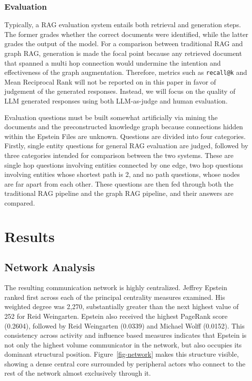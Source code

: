 \documentclass[
  letterpaper,
  DIV=11,
  numbers=noendperiod]{scrartcl}
\begin{document}
\subsubsection{Evaluation}\label{evaluation}

Typically, a RAG evaluation system entails both retrieval and generation
steps. The former grades whether the correct documents were identified,
while the latter grades the output of the model. For a comparison
between traditional RAG and graph RAG, generation is made the focal
point because any retrieved document that spanned a multi hop connection
would undermine the intention and effectiveness of the graph
augmentation. Therefore, metrics such as \texttt{recall@k} and Mean
Reciprocal Rank will not be reported on in this paper in favor of
judgement of the generated responses. Instead, we will focus on the
quality of LLM generated responses using both LLM-as-judge and human
evaluation.

Evaluation questions must be built somewhat artificially via mining the
documents and the preconstructed knowledge graph because connections
hidden within the Epstein Files are unknown. Questions are divided into
four categories. Firstly, single entity questions for general RAG
evaluation are judged, followed by three categories intended for
comparison between the two systems. These are single hop questions
involving entities connected by one edge, two hop questions involving
entities whose shortest path is 2, and no path questions, whose nodes
are far apart from each other. These questions are then fed through both
the traditional RAG pipeline and the graph RAG pipeline, and their
answers are compared.

\section{Results}\label{results}

\subsection{Network Analysis}\label{network-analysis-1}

The resulting communication network is highly centralized. Jeffrey
Epstein ranked first across each of the principal centrality measures
examined. His weighted degree was 2,270, substantially greater than the
next highest value of 252 for Reid Weingarten. Epstein also received the
highest PageRank score (0.2604), followed by Reid Weingarten (0.0339)
and Michael Wolff (0.0152). This consistency across activity and
influence based measures indicates that Epstein is not only the highest
volume communicator in the network, but also occupies its dominant
structural position. Figure~\ref{fig-network} makes this structure
visible, showing a dense central core surrounded by peripheral actors
who connect to the rest of the network almost exclusively through it.
\end{document}

